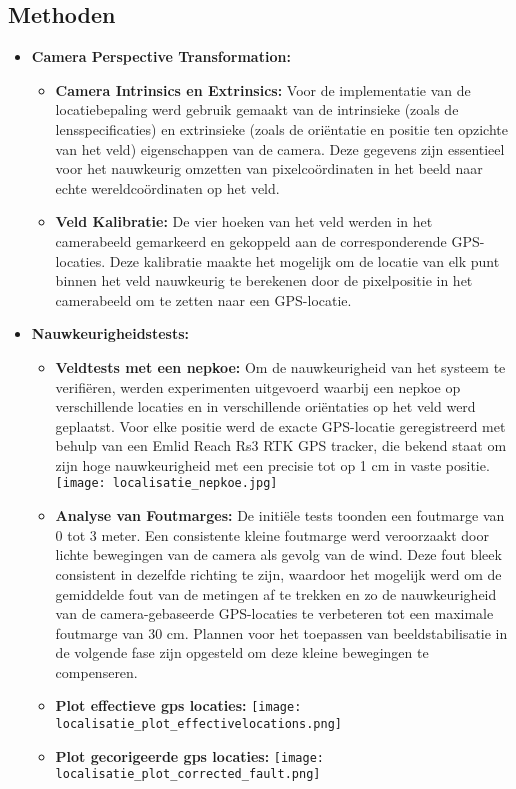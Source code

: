 \subsection{Methoden}
\begin{itemize}
  \item \textbf{Camera Perspective Transformation:}
  \begin{itemize}
    \item \textbf{Camera Intrinsics en Extrinsics:} Voor de implementatie van de locatiebepaling werd gebruik gemaakt van de intrinsieke (zoals de lensspecificaties) en extrinsieke (zoals de oriëntatie en positie ten opzichte van het veld) eigenschappen van de camera. Deze gegevens zijn essentieel voor het nauwkeurig omzetten van pixelcoördinaten in het beeld naar echte wereldcoördinaten op het veld.
    \item \textbf{Veld Kalibratie:} De vier hoeken van het veld werden in het camerabeeld gemarkeerd en gekoppeld aan de corresponderende GPS-locaties. Deze kalibratie maakte het mogelijk om de locatie van elk punt binnen het veld nauwkeurig te berekenen door de pixelpositie in het camerabeeld om te zetten naar een GPS-locatie.
  \end{itemize}
  \item \textbf{Nauwkeurigheidstests:}
  \begin{itemize}
    \item \textbf{Veldtests met een nepkoe:} Om de nauwkeurigheid van het systeem te verifiëren, werden experimenten uitgevoerd waarbij een nepkoe op verschillende locaties en in verschillende oriëntaties op het veld werd geplaatst. Voor elke positie werd de exacte GPS-locatie geregistreerd met behulp van een Emlid Reach Rs3 RTK GPS tracker, die bekend staat om zijn hoge nauwkeurigheid met een precisie tot op 1 cm in vaste positie.
    \newline 
    \texttt{[image: localisatie\_nepkoe.jpg]}
    \newline 
    \item \textbf{Analyse van Foutmarges:} De initiële tests toonden een foutmarge van 0 tot 3 meter. Een consistente kleine foutmarge werd veroorzaakt door lichte bewegingen van de camera als gevolg van de wind. Deze fout bleek consistent in dezelfde richting te zijn, waardoor het mogelijk werd om de gemiddelde fout van de metingen af te trekken en zo de nauwkeurigheid van de camera-gebaseerde GPS-locaties te verbeteren tot een maximale foutmarge van 30 cm. Plannen voor het toepassen van beeldstabilisatie in de volgende fase zijn opgesteld om deze kleine bewegingen te compenseren.
    \item \textbf{Plot effectieve gps locaties:} 
    \newline 
    \texttt{[image: localisatie\_plot\_effectivelocations.png]}
    \newline 
    \item \textbf{Plot gecorigeerde gps locaties:} 
    \newline
    \texttt{[image: localisatie\_plot\_corrected\_fault.png]}
    \newline 
  \end{itemize}
\end{itemize}

